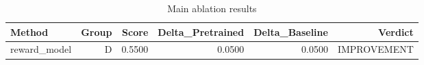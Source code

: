 \begin{table}[htbp]
\centering
\caption{Main ablation results}
\label{tab:main-results}
\begin{tabular}{lrrrrr}
\toprule
\textbf{Method} & \textbf{Group} & \textbf{Score} & \textbf{Delta\_Pretrained} & \textbf{Delta\_Baseline} & \textbf{Verdict} \\
\midrule
reward\_model & D & 0.5500 & 0.0500 & 0.0500 & IMPROVEMENT \\
\bottomrule
\end{tabular}
\end{table}